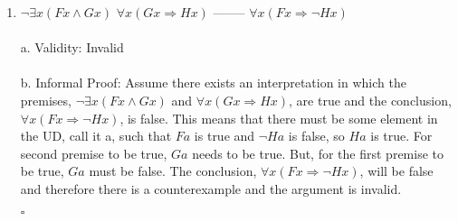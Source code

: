\documentclass[]{article}
\begin{document}
\begin{enumerate}
    \item $\neg \exists x (Fx \land Gx)$
    \newline $\forall x (Gx \Rightarrow Hx)$
    \newline --------
    \newline $\forall x (Fx \Rightarrow \neg Hx)$
    \\\\a.
    \newline Validity: Invalid
    \\\\ b.
    \newline Informal Proof:
    \newline Assume there exists an interpretation in which the premises, $\neg \exists x (Fx \land Gx)$ and $\forall x (Gx \Rightarrow Hx)$, are true and the conclusion, $\forall x (Fx \Rightarrow \neg Hx)$, is false. This means that there must be some element in the UD, call it a, such that $Fa$ is true and $\neg Ha$ is false, so $Ha$ is true. For second premise to be true, $Ga$ needs to be true. But, for the first premise to be true, $Ga$ must be false. The conclusion, $\forall x (Fx \Rightarrow \neg Hx)$, will be false and therefore there is a counterexample and the argument is invalid.
    \begin{flushright}
    $\square$
    \end{flushright}
    
\end{enumerate}
\end{document}
